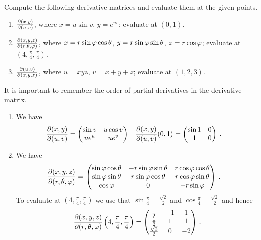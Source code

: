 \begin{question}
Compute the following derivative matrices and evaluate them at the given points.
\begin{enumerate}
\item
$\frac{\partial(x,y)}{\partial(u,v)}$, where
$x = u \sin v$, $y = e^{uv}$; evaluate at $(0,1)$.
\item
$\frac{\partial(x,y,z)}{\partial(r,\theta,\varphi)}$, where
$x = r\sin \varphi \cos \theta$, $y = r \sin \varphi \sin \theta$, $z = r \cos \varphi$; evaluate at 
$\left(4, \frac\pi 4, \frac \pi 4\right)$.
\item
$\frac{\partial(u,v)}{\partial(x,y,z)}$, where
$u = xyz$, $v = x+y+z$; evaluate at $(1, 2, 3)$.
\end{enumerate}
\end{question}

\begin{solution} It is important to remember the order of partial derivatives in the derivative matrix.
\begin{enumerate}
\item
We have
\begin{align*}
\frac{\partial(x,y)}{\partial(u,v)} &=
\begin{pmatrix}
\sin v & u \cos v \\
v e^u & u e^v
\end{pmatrix} &
\frac{\partial(x,y)}{\partial(u,v)}(0,1) &=
\begin{pmatrix}
\sin 1 & 0 \\
1 & 0
\end{pmatrix}\,.
\end{align*}
\item
We have
\begin{align*}
\frac{\partial(x,y,z)}{\partial(r,\theta,\varphi)} &=
\begin{pmatrix}
\sin \varphi \cos \theta & -r \sin \varphi \sin \theta & r \cos \varphi \cos \theta \\
\sin \varphi \sin \theta & r \sin \varphi \cos \theta & r \cos \varphi \sin \theta \\
\cos \varphi & 0 & -r \sin \varphi
\end{pmatrix}\,.
\end{align*}
To evaluate at $\left(4, \frac \pi4, \frac \pi4\right)$ we use that $\sin \frac \pi4 = \frac{\sqrt 2}2$ and $\cos \frac \pi 4 = \frac{\sqrt 2}{2}$ and hence
\[
\frac{\partial(x,y,z)}{\partial(r,\theta,\varphi)}\left(4, \frac \pi 4, \frac \pi 4\right) =
\begin{pmatrix}
\tfrac 12 & -1 & 1 \\
\tfrac 12 & 1 & 1 \\
\tfrac{\sqrt 2}2 & 0 & -2
\end{pmatrix} \,.
\]


\end{enumerate}
\end{solution}
